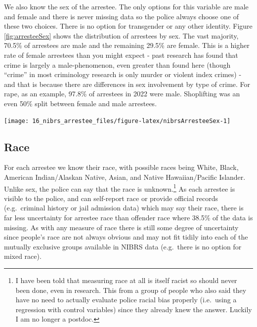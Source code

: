 \documentclass[
]{krantz}
\let\origfigure\figure
\let\endorigfigure\endfigure
\renewenvironment{figure}[1][2] {
    \expandafter\origfigure\expandafter[H]
} {
    \endorigfigure
}
\begin{document}
We also know the sex of the arrestee. The only options for
this variable are male and female and there is never missing
data so the police always choose one of these two choices.
There is no option for transgender or any other identity.
Figure \ref{fig:arresteeSex} shows the distribution of
arrestees by sex. The vast majority, 70.5\% of arrestees are
male and the remaining 29.5\% are female. This is a higher
rate of female arrestees than you might expect - past
research has found that crime is largely a male-phenomenon,
even greater than found here (though ``crime'' in most
criminology research is only murder or violent index crimes)
- and that is because there are differences in sex
involvement by type of crime. For rape, as an example,
97.8\% of arrestees in 2022 were male. Shoplifting was an
even 50\% split between female and male arrestees.

\begin{figure}

{\centering \texttt{[image: 16\_nibrs\_arrestee\_files/figure-latex/nibrsArresteeSex-1]} 

}

\caption{The share of arrestees by sex, 1991-2023.}\label{fig:nibrsArresteeSex}
\end{figure}

\subsection{Race}\label{race-4}

For each arrestee we know their race, with possible races
being White, Black, American Indian/Alaskan Native, Asian,
and Native Hawaiian/Pacific Islander. Unlike sex, the police
can say that the race is unknown.\footnote{I have been told
  that measuring race at all is itself racist so should
  never been done, even in research. This from a group of
  people who also said they have no need to actually
  evaluate police racial bias properly (i.e.~using a
  regression with control variables) since they already knew
  the answer. Luckily I am no longer a postdoc.} As each
arrestee is visible to the police, and can self-report race
or provide official records (e.g.~criminal history or jail
admission data) which may say their race, there is far less
uncertainty for arrestee race than offender race where
38.5\% of the data is missing. As with any measure of race
there is still some degree of uncertainty since people's
race are not always obvious and may not fit tidily into each
of the mutually exclusive groups available in NIBRS data
(e.g.~there is no option for mixed race).
\end{document}
